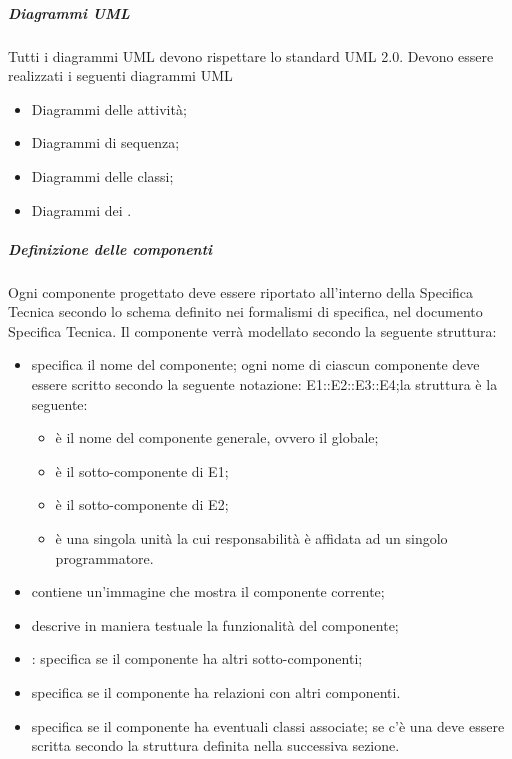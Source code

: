 \subparagraph{Diagrammi UML}

Tutti i diagrammi UML devono rispettare lo standard UML 2.0.
Devono essere realizzati i seguenti diagrammi UML
\begin{itemize}
\item Diagrammi delle attività;
\item Diagrammi di sequenza;
\item Diagrammi delle classi;
\item Diagrammi dei .
\end{itemize}

\subparagraph{Definizione delle componenti}

Ogni componente progettato deve essere riportato all'interno della Specifica Tecnica secondo lo schema definito nei formalismi di specifica, nel documento Specifica Tecnica. Il componente verrà modellato secondo la seguente struttura:
\begin{itemize}
\item {}specifica il nome del componente; ogni nome di ciascun componente deve essere scritto secondo la seguente notazione: E1::E2::E3::E4;la struttura è la seguente:
\begin{itemize}
\item {}è il nome del componente generale, ovvero il  globale;
\item {}è il sotto-componente di E1;
\item {}è il sotto-componente di E2;
\item {}è una singola unità la cui responsabilità è affidata ad un singolo programmatore.
\end{itemize}
\item {}contiene un'immagine che mostra il componente corrente;
\item {}descrive in maniera testuale la funzionalità del componente;
\item {}: specifica se il componente ha altri sotto-componenti;
\item {} specifica se il componente ha relazioni con altri componenti.
\item {}specifica se il componente ha eventuali classi associate; se c'è una  deve essere scritta secondo la struttura definita nella successiva sezione.
\end{itemize}

